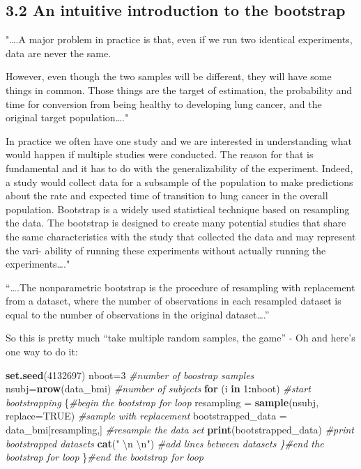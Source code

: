 \documentclass[]{article}
\newenvironment{Shaded}{\begin{snugshade}}{\end{snugshade}}
\newcommand{\CharTok}[1]{\textcolor[rgb]{0.31,0.60,0.02}{#1}}
\newcommand{\CommentTok}[1]{\textcolor[rgb]{0.56,0.35,0.01}{\textit{#1}}}
\newcommand{\ControlFlowTok}[1]{\textcolor[rgb]{0.13,0.29,0.53}{\textbf{#1}}}
\newcommand{\DataTypeTok}[1]{\textcolor[rgb]{0.13,0.29,0.53}{#1}}
\newcommand{\DecValTok}[1]{\textcolor[rgb]{0.00,0.00,0.81}{#1}}
\newcommand{\KeywordTok}[1]{\textcolor[rgb]{0.13,0.29,0.53}{\textbf{#1}}}
\newcommand{\NormalTok}[1]{#1}
\newcommand{\OperatorTok}[1]{\textcolor[rgb]{0.81,0.36,0.00}{\textbf{#1}}}
\newcommand{\OtherTok}[1]{\textcolor[rgb]{0.56,0.35,0.01}{#1}}
\newcommand{\StringTok}[1]{\textcolor[rgb]{0.31,0.60,0.02}{#1}}
\begin{document}
\hypertarget{an-intuitive-introduction-to-the-bootstrap}{%
\subsection{3.2 An intuitive introduction to the
bootstrap}\label{an-intuitive-introduction-to-the-bootstrap}}

"\ldots{}.A major problem in practice is that, even if we run two
identical experiments, data are never the same.

However, even though the two samples will be different, they will have
some things in common. Those things are the target of estimation, the
probability and time for conversion from being healthy to developing
lung cancer, and the original target population\ldots{}."

In practice we often have one study and we are interested in
understanding what would happen if multiple studies were conducted. The
reason for that is fundamental and it has to do with the
generalizability of the experiment. Indeed, a study would collect data
for a subsample of the population to make predictions about the rate and
expected time of transition to lung cancer in the overall population.
Bootstrap is a widely used statistical technique based on resampling the
data. The bootstrap is designed to create many potential studies that
share the same characteristics with the study that collected the data
and may represent the vari- ability of running these experiments without
actually running the experiments\ldots{}."

``\ldots{}.The nonparametric bootstrap is the procedure of resampling
with replacement from a dataset, where the number of observations in
each resampled dataset is equal to the number of observations in the
original dataset\ldots{}.''

So this is pretty much ``take multiple random samples, the game'' - Oh
and here's one way to do it:

\begin{Shaded}
\begin{Highlighting}[]
\KeywordTok{set.seed}\NormalTok{(}\DecValTok{4132697}\NormalTok{) }
\NormalTok{nboot=}\DecValTok{3} \CommentTok{#number of boostrap samples }
\NormalTok{nsubj=}\KeywordTok{nrow}\NormalTok{(data_bmi) }\CommentTok{#number of subjects }
\ControlFlowTok{for}\NormalTok{ (i }\ControlFlowTok{in} \DecValTok{1}\OperatorTok{:}\NormalTok{nboot) }\CommentTok{#start bootstrapping }
\NormalTok{  \{}\CommentTok{#begin the bootstrap for loop }
\NormalTok{    resampling =}\StringTok{ }\KeywordTok{sample}\NormalTok{(nsubj, }\DataTypeTok{replace=}\OtherTok{TRUE}\NormalTok{) }\CommentTok{#sample with replacement }
\NormalTok{    bootstrapped_data =}\StringTok{ }\NormalTok{data_bmi[resampling,] }\CommentTok{#resample the data set }
    \KeywordTok{print}\NormalTok{(bootstrapped_data) }\CommentTok{#print bootstrapped datasets }
    \KeywordTok{cat}\NormalTok{(}\StringTok{" }\CharTok{\textbackslash{}n}\StringTok{ }\CharTok{\textbackslash{}n}\StringTok{"}\NormalTok{) }\CommentTok{#add lines between datasets \}#end the bootstrap for loop}
\NormalTok{  \}}\CommentTok{#end the bootstrap for loop}
\end{Highlighting}
\end{Shaded}
\end{document}
